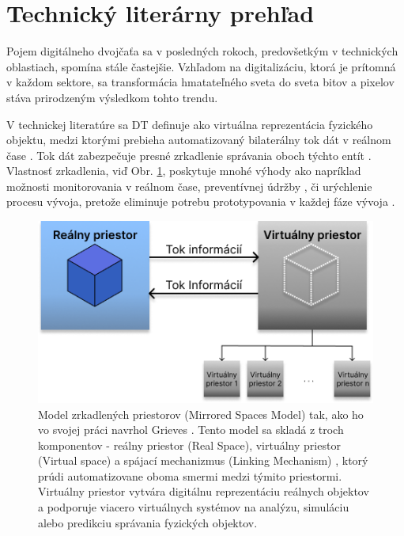\section{Technický literárny prehľad}
\par{
Pojem digitálneho dvojčaťa sa v posledných rokoch, predovšetkým v technických oblastiach, spomína stále častejšie. Vzhľadom na digitalizáciu, ktorá je prítomná v každom sektore, sa transformácia hmatateľného sveta do sveta bitov a pixelov stáva prirodzeným výsledkom tohto trendu. 
}
\par{
V technickej literatúre sa DT definuje ako virtuálna reprezentácia fyzického objektu, medzi ktorými prebieha automatizovaný bilaterálny tok dát v reálnom čase \cite{DT:OriginToFuture}. Tok dát zabezpečuje presné zrkadlenie správania oboch týchto entít \cite{systematicReview}. Vlastnosť zrkadlenia, viď Obr. \ref{fig:PLM}, poskytuje mnohé výhody ako napríklad možnosti monitorovania v reálnom čase, preventívnej údržby \cite{5g&beyond}, či urýchlenie procesu vývoja, pretože eliminuje potrebu prototypovania v každej fáze vývoja \cite{mitigating_book}.
}
\newline
\begin{figure}[H]
    \centering
    \includegraphics[width=0.75\linewidth]{assets/images/Grieves_PLM_model.png}
    \caption{Model zrkadlených priestorov (Mirrored Spaces Model) tak, ako ho vo svojej práci navrhol Grieves \cite{Grieves}. Tento model sa skladá z troch komponentov - reálny priestor (Real Space), virtuálny priestor (Virtual space) a spájací mechanizmus (Linking Mechanism) \cite{DT:OriginToFuture}, ktorý prúdi automatizovane oboma smermi medzi týmito priestormi. Virtuálny priestor vytvára digitálnu reprezentáciu reálnych objektov a podporuje viacero virtuálnych systémov na analýzu, simuláciu alebo predikciu správania fyzických objektov.}
    \label{fig:PLM}
\end{figure}


